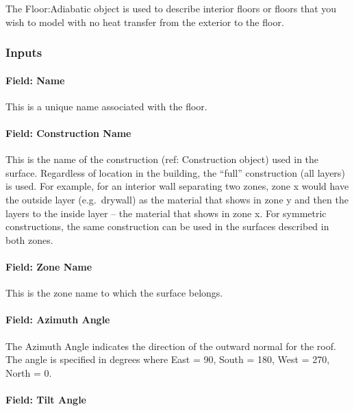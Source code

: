 The Floor:Adiabatic object is used to describe interior floors or floors that you wish to model with no heat transfer from the exterior to the floor.

\subsubsection{Inputs}\label{inputs-12-019}

\paragraph{Field: Name}\label{field-name-8-022}

This is a unique name associated with the floor.

\paragraph{Field: Construction Name}\label{field-construction-name-8}

This is the name of the construction (ref: Construction object) used in the surface. Regardless of location in the building, the ``full'' construction (all layers) is used. For example, for an interior wall separating two zones, zone x would have the outside layer (e.g.~drywall) as the material that shows in zone y and then the layers to the inside layer -- the material that shows in zone x. For symmetric constructions, the same construction can be used in the surfaces described in both zones.

\paragraph{Field: Zone Name}\label{field-zone-name-8-003}

This is the zone name to which the surface belongs.

\paragraph{Field: Azimuth Angle}\label{field-azimuth-angle-8}

The Azimuth Angle indicates the direction of the outward normal for the roof. The angle is specified in degrees where East = 90, South = 180, West = 270, North = 0.

\paragraph{Field: Tilt Angle}\label{field-tilt-angle-8}

